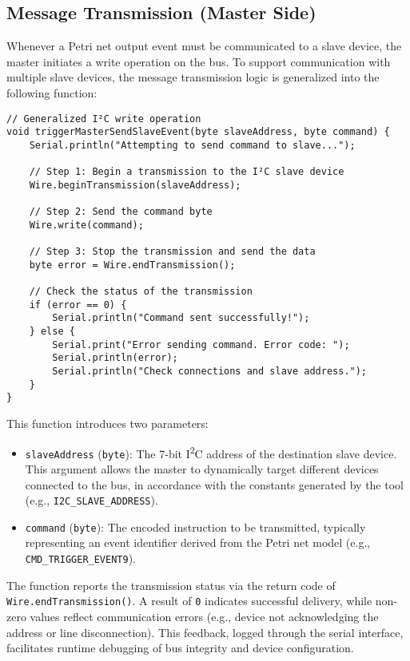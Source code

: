 \subsection{Message Transmission (Master Side)}
Whenever a Petri net output event must be communicated to a slave device, the master initiates a write operation on the bus. To support communication with multiple slave devices, the message transmission logic is generalized into the following function:

\begin{verbatim}
// Generalized I²C write operation
void triggerMasterSendSlaveEvent(byte slaveAddress, byte command) {
    Serial.println("Attempting to send command to slave...");

    // Step 1: Begin a transmission to the I²C slave device
    Wire.beginTransmission(slaveAddress);

    // Step 2: Send the command byte
    Wire.write(command);

    // Step 3: Stop the transmission and send the data
    byte error = Wire.endTransmission();

    // Check the status of the transmission
    if (error == 0) {
        Serial.println("Command sent successfully!");
    } else {
        Serial.print("Error sending command. Error code: ");
        Serial.println(error);
        Serial.println("Check connections and slave address.");
    }
}
\end{verbatim}

\noindent
This function introduces two parameters:
\begin{itemize}
    \item \texttt{slaveAddress} (\texttt{byte}): The 7-bit I\textsuperscript{2}C address of the destination slave device. This argument allows the master to dynamically target different devices connected to the bus, in accordance with the constants generated by the tool (e.g., \texttt{I2C\_SLAVE\_ADDRESS}).
    \item \texttt{command} (\texttt{byte}): The encoded instruction to be transmitted, typically representing an event identifier derived from the Petri net model (e.g., \texttt{CMD\_TRIGGER\_EVENT9}).
\end{itemize}

The function reports the transmission status via the return code of \texttt{Wire.endTransmission()}. A result of \texttt{0} indicates successful delivery, while non-zero values reflect communication errors (e.g., device not acknowledging the address or line disconnection). This feedback, logged through the serial interface, facilitates runtime debugging of bus integrity and device configuration.

